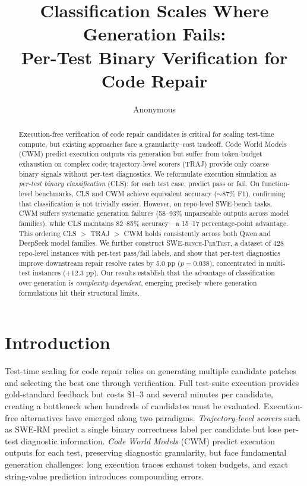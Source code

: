 \documentclass[11pt,a4paper]{article}
\title{Classification Scales Where Generation Fails:\\Per-Test Binary Verification for Code Repair}
\author{Anonymous}
\begin{document}
\maketitle

\begin{abstract}
Execution-free verification of code repair candidates is critical for scaling test-time compute, but existing approaches face a granularity--cost tradeoff.
Code World Models (CWM) predict execution outputs via generation but suffer from token-budget exhaustion on complex code; trajectory-level scorers (TRAJ) provide only coarse binary signals without per-test diagnostics.
We reformulate execution simulation as \emph{per-test binary classification} (CLS): for each test case, predict pass or fail.
On function-level benchmarks, CLS and CWM achieve equivalent accuracy ($\sim$87\% F1), confirming that classification is not trivially easier.
However, on repo-level SWE-bench tasks, CWM suffers systematic generation failures (58--93\% unparseable outputs across model families), while CLS maintains 82--85\% accuracy---a 15--17 percentage-point advantage.
This ordering CLS $>$ TRAJ $>$ CWM holds consistently across both Qwen and DeepSeek model families.
We further construct \textsc{SWE-bench-PerTest}, a dataset of 428 repo-level instances with per-test pass/fail labels, and show that per-test diagnostics improve downstream repair resolve rates by 5.0 pp ($p{=}0.038$), concentrated in multi-test instances (+12.3 pp).
Our results establish that the advantage of classification over generation is \emph{complexity-dependent}, emerging precisely where generation formulations hit their structural limits.
\end{abstract}

\section{Introduction}

Test-time scaling for code repair relies on generating multiple candidate patches and selecting the best one through verification.
Full test-suite execution provides gold-standard feedback but costs \$1--3 and several minutes per candidate, creating a bottleneck when hundreds of candidates must be evaluated.
Execution-free alternatives have emerged along two paradigms.
\emph{Trajectory-level scorers} such as SWE-RM predict a single binary correctness label per candidate but lose per-test diagnostic information.
\emph{Code World Models} (CWM) predict execution outputs for each test, preserving diagnostic granularity, but face fundamental generation challenges: long execution traces exhaust token budgets, and exact string-value prediction introduces compounding errors.
\end{document}
